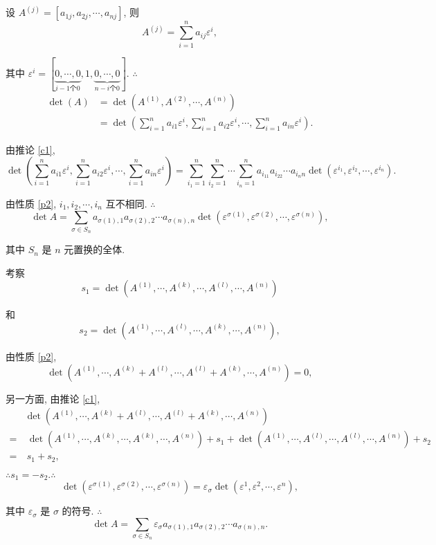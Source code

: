 \documentclass{ctexart}
\begin{document}
设 $A^{(j)}=[a_{1j},a_{2j},\cdots,a_{nj}]$, 则
\[A^{(j)}=\sum\limits_{i=1}^na_{ij}\varepsilon^i,\]

其中 $\varepsilon^i=[\underbrace{0,\cdots,0}_{i-1\text{个}0},1,\underbrace{0,\cdots,0}_{n-i\text{个}0}]$. $\therefore$
\begin{align*}
    \det(A) & =\det(A^{(1)},A^{(2)},\cdots,A^{(n)}) \\
    & =\det\left(\sum\limits_{i=1}^na_{i1}\varepsilon^i,\sum\limits_{i=1}^na_{i2}\varepsilon^i,\cdots,\sum\limits_{i=1}^na_{in}\varepsilon^i\right).
\end{align*}

由推论 \ref{c1}, 
\[\det\left(\sum\limits_{i=1}^na_{i1}\varepsilon^i,\sum\limits_{i=1}^na_{i2}\varepsilon^i,\cdots,\sum\limits_{i=1}^na_{in}\varepsilon^i\right)=\sum\limits_{i_1=1}^n\sum\limits_{i_2=1}^n\cdots\sum\limits_{i_n=1}^na_{i_11}a_{i_22}\cdots a_{i_nn}\det\left(\varepsilon^{i_1},\varepsilon^{i_2},\cdots,\varepsilon^{i_n}\right).\]

由性质 \ref{p2}, $i_1,i_2,\cdots,i_n$ 互不相同. $\therefore$
\[\det A=\sum\limits_{\sigma\in S_n}a_{\sigma(1),1}a_{\sigma(2),2}\cdots a_{\sigma(n),n}\det\left(\varepsilon^{\sigma(1)},\varepsilon^{\sigma(2)},\cdots,\varepsilon^{\sigma(n)}\right),\]

其中 $S_n$ 是 $n$ 元置换的全体.

考察
\[s_1=\det(A^{(1)},\cdots,A^{(k)},\cdots,A^{(l)},\cdots,A^{(n)})\]

和
\[s_2=\det(A^{(1)},\cdots,A^{(l)},\cdots,A^{(k)},\cdots,A^{(n)}),\]

由性质 \ref{p2},
\[\det(A^{(1)},\cdots,A^{(k)}+A^{(l)},\cdots,A^{(l)}+A^{(k)},\cdots,A^{(n)})=0,\]

另一方面, 由推论 \ref{c1},
\begin{align*}
    & \det(A^{(1)},\cdots,A^{(k)}+A^{(l)},\cdots,A^{(l)}+A^{(k)},\cdots,A^{(n)}) \\
    = & \ \det(A^{(1)},\cdots,A^{(k)},\cdots,A^{(k)},\cdots,A^{(n)})+s_1+\det(A^{(1)},\cdots,A^{(l)},\cdots,A^{(l)},\cdots,A^{(n)})+s_2 \\
    = & \ s_1+s_2,
\end{align*}

$\therefore s_1=-s_2.\therefore$
\[\det\left(\varepsilon^{\sigma(1)},\varepsilon^{\sigma(2)},\cdots,\varepsilon^{\sigma(n)}\right)=\varepsilon_\sigma \det(\varepsilon^1,\varepsilon^2,\cdots,\varepsilon^n),\]

其中 $\varepsilon_\sigma$ 是 $\sigma$ 的符号. $\therefore$
\begin{equation}\label{eq1.1}
    \det A=\sum\limits_{\sigma\in S_n}\varepsilon_\sigma a_{\sigma(1),1}a_{\sigma(2),2}\cdots a_{\sigma(n),n}.
\end{equation}
\end{document}
